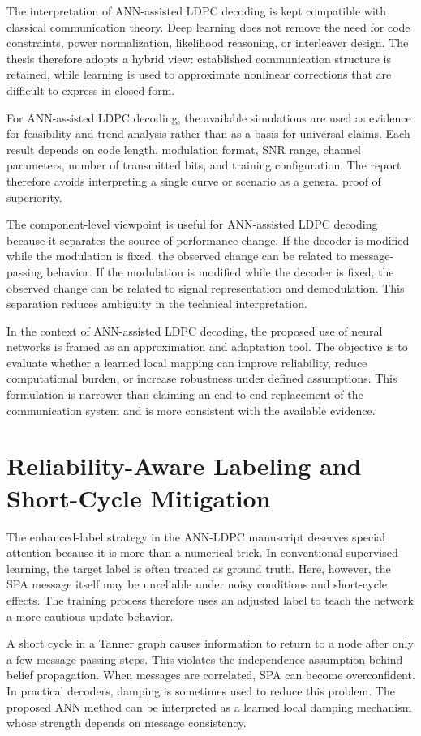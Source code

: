 The interpretation of ANN-assisted LDPC decoding is kept compatible with classical communication theory. Deep learning does not remove the need for code constraints, power normalization, likelihood reasoning, or interleaver design. The thesis therefore adopts a hybrid view: established communication structure is retained, while learning is used to approximate nonlinear corrections that are difficult to express in closed form.

For ANN-assisted LDPC decoding, the available simulations are used as evidence for feasibility and trend analysis rather than as a basis for universal claims. Each result depends on code length, modulation format, SNR range, channel parameters, number of transmitted bits, and training configuration. The report therefore avoids interpreting a single curve or scenario as a general proof of superiority.

The component-level viewpoint is useful for ANN-assisted LDPC decoding because it separates the source of performance change. If the decoder is modified while the modulation is fixed, the observed change can be related to message-passing behavior. If the modulation is modified while the decoder is fixed, the observed change can be related to signal representation and demodulation. This separation reduces ambiguity in the technical interpretation.

In the context of ANN-assisted LDPC decoding, the proposed use of neural networks is framed as an approximation and adaptation tool. The objective is to evaluate whether a learned local mapping can improve reliability, reduce computational burden, or increase robustness under defined assumptions. This formulation is narrower than claiming an end-to-end replacement of the communication system and is more consistent with the available evidence.

\section{Reliability-Aware Labeling and Short-Cycle Mitigation}
The enhanced-label strategy in the ANN-LDPC manuscript deserves special attention because it is more than a numerical trick. In conventional supervised learning, the target label is often treated as ground truth. Here, however, the SPA message itself may be unreliable under noisy conditions and short-cycle effects. The training process therefore uses an adjusted label to teach the network a more cautious update behavior.

A short cycle in a Tanner graph causes information to return to a node after only a few message-passing steps. This violates the independence assumption behind belief propagation. When messages are correlated, SPA can become overconfident. In practical decoders, damping is sometimes used to reduce this problem. The proposed ANN method can be interpreted as a learned local damping mechanism whose strength depends on message consistency.

